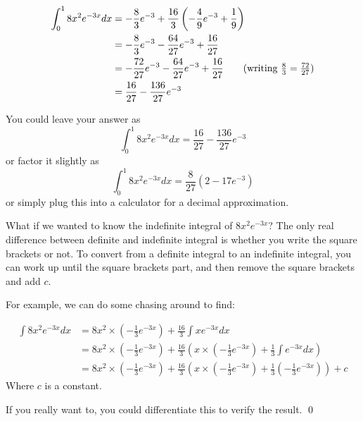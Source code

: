 \begin{solution}
    \begin{align*}
        \int_0^{1} 8 x^2 e^{-3x} dx &= -\frac{8}{3}e^{-3} + \frac{16}{3}\left(-\frac{4}{9}e^{-3} + \frac{1}{9}\right) \\
        &= -\frac{8}{3}e^{-3} - \frac{64}{27}e^{-3} + \frac{16}{27} \\
        &= -\frac{72}{27}e^{-3} - \frac{64}{27}e^{-3} + \frac{16}{27} \tag{writing $\frac{8}{3} = \frac{72}{27}$} \\
        &= \frac{16}{27} - \frac{136}{27}e^{-3}
    \end{align*}

    You could leave your answer as
    \[
        \int_0^{1} 8 x^2 e^{-3x} dx = \frac{16}{27} - \frac{136}{27}e^{-3}
    \]
    or factor it slightly as
    \[
        \int_0^{1} 8 x^2 e^{-3x} dx = \frac{8}{27}\left(2 - 17e^{-3}\right)
    \]
    or simply plug this into a calculator for a decimal approximation.

    What if we wanted to know the indefinite integral of $8 x^2 e^{-3x} $? The only real difference between definite and indefinite integral is whether you write the square brackets or not.
    To convert from a definite integral to an indefinite integral, you can work up until the square brackets part, and then remove the square brackets and add $c$.

    For example, we can do some chasing around to find:

    \begin{align*}
        \int 8 x^2 e^{-3x} dx &= 8x^2\times (-\frac{1}{3}e^{-3x}) + \frac{16}{3}\int x  e^{-3x} dx \tag{reusing work up until square brackets} \\
         &= 8x^2\times (-\frac{1}{3}e^{-3x}) + \frac{16}{3} \left( x \times \left(-\frac{1}{3}e^{-3x}\right) + \frac{1}{3}\int e^{-3x} dx\right) \\
         &=   8x^2\times (-\frac{1}{3}e^{-3x}) + \frac{16}{3} \left( x \times \left(-\frac{1}{3}e^{-3x}\right) + \frac{1}{3}\left(-\frac{1}{3}e^{-3x}\right)\right) + c
    \end{align*}
    Where $c$ is a constant.

    If you really want to, you could differentiate this to verify the result.
    \qed
\end{solution}

